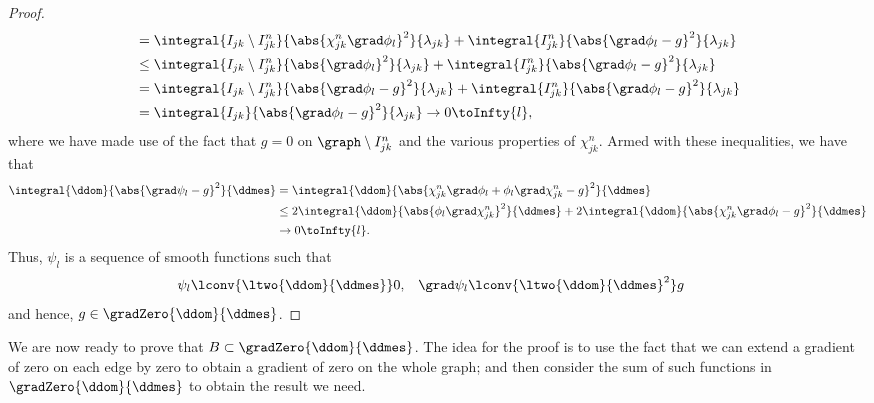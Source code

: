 \begin{proof}
\begin{align*}
		&= \integral{I_{jk}\setminus I_{jk}^n}{\abs{\chi_{jk}^n\grad\phi_l}^2}{\lambda_{jk}} +  \integral{I_{jk}^n}{\abs{\grad\phi_l - g}^2}{\lambda_{jk}} \\
		&\leq \integral{I_{jk}\setminus I_{jk}^n}{\abs{\grad\phi_l}^2}{\lambda_{jk}} +  \integral{I_{jk}^n}{\abs{\grad\phi_l - g}^2}{\lambda_{jk}} \\
		&= \integral{I_{jk}\setminus I_{jk}^n}{\abs{\grad\phi_l - g}^2}{\lambda_{jk}} +  \integral{I_{jk}^n}{\abs{\grad\phi_l - g}^2}{\lambda_{jk}} \\
		&= \integral{I_{jk}}{\abs{\grad\phi_l - g}^2}{\lambda_{jk}} \rightarrow0 \toInfty{l},
	\end{align*}
	where we have made use of the fact that $g=0$ on $\graph\setminus I_{jk}^n$ and the various properties of $\chi_{jk}^n$.
	Armed with these inequalities, we have that
	\begin{align*}
		\integral{\ddom}{\abs{\grad\psi_l - g}^2}{\ddmes} 
		&= \integral{\ddom}{\abs{\chi_{jk}^n\grad\phi_l + \phi_l\grad\chi_{jk}^n - g}^2}{\ddmes} \\
		&\leq 2\integral{\ddom}{\abs{\phi_l\grad\chi_{jk}^n}^2}{\ddmes} + 2\integral{\ddom}{\abs{\chi_{jk}^n\grad\phi_l - g}^2}{\ddmes} \\
		&\rightarrow0 \toInfty{l}.
	\end{align*}
	Thus, $\psi_l$ is a sequence of smooth functions such that
	\begin{align*}
		\psi_l \lconv{\ltwo{\ddom}{\ddmes}} 0, &\quad
		\grad\psi_l \lconv{\ltwo{\ddom}{\ddmes}^2} g
	\end{align*}
	and hence, $g\in\gradZero{\ddom}{\ddmes}$.
\end{proof}

We are now ready to prove that $B\subset\gradZero{\ddom}{\ddmes}$.
The idea for the proof is to use the fact that we can extend a gradient of zero on each edge by zero to obtain a gradient of zero on the whole graph; and then consider the sum of such functions in $\gradZero{\ddom}{\ddmes}$ to obtain the result we need.

